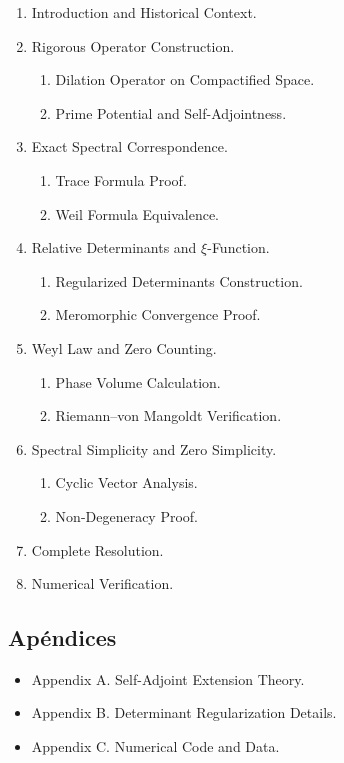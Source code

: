 \begin{enumerate}
  \item Introduction and Historical Context.
  \item Rigorous Operator Construction.
  \begin{enumerate}
    \item Dilation Operator on Compactified Space.
    \item Prime Potential and Self-Adjointness.
  \end{enumerate}
  \item Exact Spectral Correspondence.
  \begin{enumerate}
    \item Trace Formula Proof.
    \item Weil Formula Equivalence.
  \end{enumerate}
  \item Relative Determinants and $\xi$-Function.
  \begin{enumerate}
    \item Regularized Determinants Construction.
    \item Meromorphic Convergence Proof.
  \end{enumerate}
  \item Weyl Law and Zero Counting.
  \begin{enumerate}
    \item Phase Volume Calculation.
    \item Riemann--von Mangoldt Verification.
  \end{enumerate}
  \item Spectral Simplicity and Zero Simplicity.
  \begin{enumerate}
    \item Cyclic Vector Analysis.
    \item Non-Degeneracy Proof.
  \end{enumerate}
  \item Complete Resolution.
  \item Numerical Verification.
\end{enumerate}

\subsection*{Apéndices}

\begin{itemize}
  \item Appendix A. Self-Adjoint Extension Theory.
  \item Appendix B. Determinant Regularization Details.
  \item Appendix C. Numerical Code and Data.
\end{itemize}


